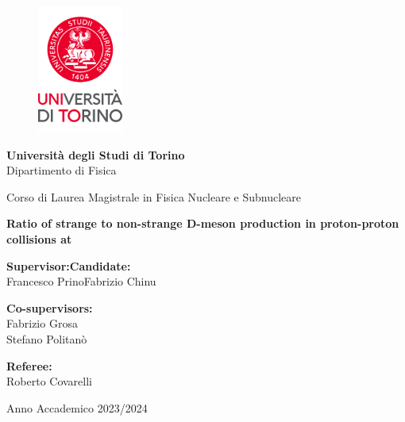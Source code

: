 \begin{center}
    \begin{figure}[h]
        \centering
        \includegraphics[width=0.25\textwidth]{logounito.png}
    \end{figure}
    \Large{{\textbf{Università degli Studi di Torino}}}\\
    \Large{Dipartimento di Fisica}
    \vspace{1.25cm}
    
    \Large{Corso di Laurea Magistrale in Fisica Nucleare e Subnucleare}\\
    \vspace{1.75cm}
    
    \LARGE{\textbf{Ratio of strange to non-strange D-meson production in proton-proton collisions at \boldmath\thirteen}}\\
    \vspace{1.75cm}

\end{center} 

\Large{
\noindent\textbf{Supervisor:}\hfill\textbf{Candidate:}\\
Francesco Prino\hfill Fabrizio Chinu\\
\vspace{0.5cm}

\noindent\textbf{Co-supervisors:}\\
Fabrizio Grosa\\
Stefano Politanò\\
\vspace{0.5cm}

\noindent\textbf{Referee:}\\
Roberto Covarelli\\}

\vspace{0.5cm}


\begin{center}
    \Large{Anno Accademico 2023/2024}
\end{center}

\normalsize


